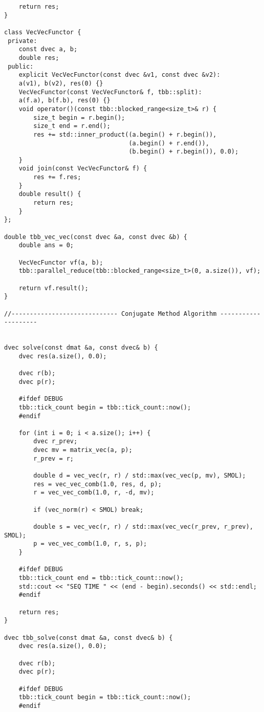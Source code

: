 \documentclass[14pt, russian]{extarticle}
\begin{document}
\begin{lstlisting}
    return res;
}

class VecVecFunctor {
 private:
    const dvec a, b;
    double res;
 public:
    explicit VecVecFunctor(const dvec &v1, const dvec &v2):
    a(v1), b(v2), res(0) {}
    VecVecFunctor(const VecVecFunctor& f, tbb::split):
    a(f.a), b(f.b), res(0) {}
    void operator()(const tbb::blocked_range<size_t>& r) {
        size_t begin = r.begin();
        size_t end = r.end();
        res += std::inner_product((a.begin() + r.begin()),
                                  (a.begin() + r.end()),
                                  (b.begin() + r.begin()), 0.0);
    }
    void join(const VecVecFunctor& f) {
        res += f.res;
    }
    double result() {
        return res;
    }
};

double tbb_vec_vec(const dvec &a, const dvec &b) {
    double ans = 0;

    VecVecFunctor vf(a, b);
    tbb::parallel_reduce(tbb::blocked_range<size_t>(0, a.size()), vf);

    return vf.result();
}

//----------------------------- Conjugate Method Algorithm --------------------


dvec solve(const dmat &a, const dvec& b) {
    dvec res(a.size(), 0.0);

    dvec r(b);
    dvec p(r);

    #ifdef DEBUG
    tbb::tick_count begin = tbb::tick_count::now();
    #endif

    for (int i = 0; i < a.size(); i++) {
        dvec r_prev;
        dvec mv = matrix_vec(a, p);
        r_prev = r;

        double d = vec_vec(r, r) / std::max(vec_vec(p, mv), SMOL);
        res = vec_vec_comb(1.0, res, d, p);
        r = vec_vec_comb(1.0, r, -d, mv);

        if (vec_norm(r) < SMOL) break;

        double s = vec_vec(r, r) / std::max(vec_vec(r_prev, r_prev), SMOL);
        p = vec_vec_comb(1.0, r, s, p);
    }

    #ifdef DEBUG
    tbb::tick_count end = tbb::tick_count::now();
    std::cout << "SEQ TIME " << (end - begin).seconds() << std::endl;
    #endif

    return res;
}

dvec tbb_solve(const dmat &a, const dvec& b) {
    dvec res(a.size(), 0.0);

    dvec r(b);
    dvec p(r);

    #ifdef DEBUG
    tbb::tick_count begin = tbb::tick_count::now();
    #endif


\end{lstlisting}
\end{document}
